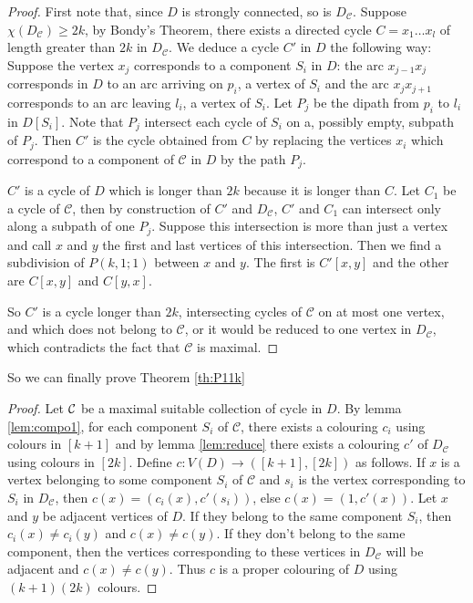 \documentclass[utf8,11pt]{article}
\theoremstyle{plain}
\theoremstyle{definition}
\theoremstyle{remark}
\begin{document}
\begin{proof}
First note that, since $D$ is strongly connected,  so is $D_{\mathcal{C}}$. Suppose $\chi(D_{\mathcal{C}}) \geq 2k$, by Bondy's Theorem, there exists a directed cycle
$C = x_1\dots x_l$ of length greater than $2k$ in $ D_{\mathcal{C}}$. We deduce a cycle $C'$ in $D$ the following way:
Suppose the vertex $x_j$ corresponds to a component $S_i$ in $D$: the arc $x_{j-1}x_j$ corresponds in $D$ to an arc arriving on 
$p_i$, a vertex of $S_i$ and the arc $x_jx_{j+1}$ corresponds to an arc leaving $l_i$, a vertex of $S_i$. Let $P_j$ be the dipath 
from $p_i$ to $l_i$ in $D[S_i]$. Note that $P_j$ intersect each cycle of $S_i$ on a, possibly empty, subpath of $P_j$. 
Then $C'$ is the cycle obtained from $C$ by replacing the vertices $x_i$ which correspond to a component of $\mathcal{C}$ in $D$ by the path $P_j$.

$C'$ is a cycle of $D$ which is longer than $2k$ because it is longer than $C$. Let $C_1$ be a cycle of $\mathcal{C}$, then by construction of $C'$ 
and $D_{\mathcal{C}}$, $C'$ and $C_1$ can intersect only along a subpath of one $P_j$. Suppose this intersection is more than just a vertex and call $x$ and
$y$ the first and last vertices of this intersection. Then we find a subdivision of $P(k,1;1)$ between $x$ and $y$. The first is $C'[x,y]$ and the other are
$C[x,y]$ and $C[y,x]$.

So $C'$ is a cycle longer than $2k$, intersecting cycles of $\mathcal{C}$ on at most one vertex, and which does not belong to $\mathcal{C}$, or it would be reduced
to one vertex in $D_{\mathcal{C}}$, which contradicts the fact that $\mathcal{C}$ is maximal.
\end{proof}

So we can finally prove Theorem \ref{th:P11k}

\begin{proof}
Let ${\cal C}$ be a maximal suitable collection of cycle in $D$. By lemma \ref{lem:compo1}, for each component $S_i$ of $\mathcal{C}$, there exists a colouring
$c_i$ using colours in $[k+1]$ and by lemma \ref{lem:reduce} there exists a colouring $c'$ of $D_{\mathcal{C}}$ using colours in $[2k]$. 
Define $c : V(D) \rightarrow ([k+1],[2k])$ as follows. If $x$ is a vertex belonging to some component $S_i$ of $\mathcal{C}$ and $s_i$ 
is the vertex corresponding to $S_i$ in $D_{\mathcal{C}}$, then $c(x) = (c_i(x), c'(s_i))$, else $c(x) =(1,c'(x))$. 
Let $x$ and $y$ be adjacent vertices of $D$. If they belong to the same component $S_i$, then $c_i(x) \not = c_i(y)$ and $c(x) \not = c(y)$. If they don't belong
to the same component, then the vertices corresponding to these vertices in $D_{\mathcal{C}}$ will be adjacent and $c(x) \not = c(y)$. 
Thus $c$ is a proper colouring of $D$ using $(k+1)(2k)$ colours. 
\end{proof}
\end{document}
